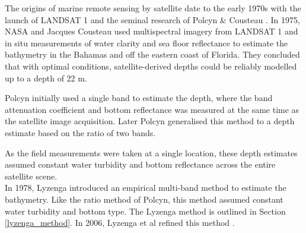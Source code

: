 \documentclass[12pt]{article}
\numberwithin{equation}{section}
\begin{document}
The origins of marine remote sensing by satellite date to the early 1970s with the launch of LANDSAT 1 
and the seminal research of Polcyn \& Cousteau \cite{polcyn1970}\cite{polycn1976}. In 1975, NASA and Jacques 
Cousteau used multispectral imagery from LANDSAT 1 and in situ measurements of water clarity and 
sea floor reflectance to estimate the bathymetry in the Bahamas and off the eastern coast of Florida. They 
concluded that with optimal conditions, satellite-derived depths could be reliably modelled up to a depth of 22 m. 

Polcyn initially used a single band to estimate the depth, where the band attenuation coefficient and 
bottom reflectance was measured at the same time as the satellite image acquisition. Later Polcyn generalised 
this method to a depth estimate based on the ratio of two bands. 

As the field measurements were taken at a single location, these depth estimates assumed constant 
water turbidity and bottom reflectance across the entire satellite scene. \\

In 1978, Lyzenga \cite{lyzenga1978} introduced an empirical multi-band method to estimate the 
bathymetry. Like the ratio method of Polcyn, this method assumed constant water turbidity and 
bottom type. The Lyzenga method is outlined in Section \ref{lyzenga_method}. In 2006, Lyzenga 
et al refined this method \cite{lyzenga2006}. \\
\end{document}
